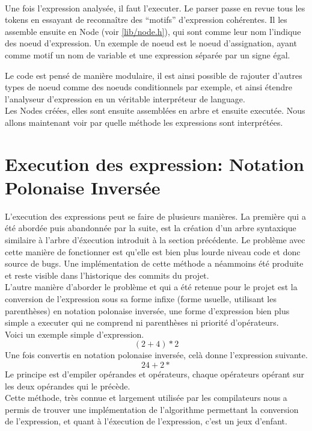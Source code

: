         \newpage

        \paragraph{}
            Une fois l'expression analysée, il faut l'executer. Le parser passe en revue tous les tokens en essayant de reconnaître des ``motifs'' d'expression cohérentes. Il les assemble ensuite en Node (voir \ref{lib/node.h}), qui sont comme leur nom l'indique des noeud d'expression. Un exemple de noeud est le noeud d'assignation, ayant comme motif un nom de variable et une expression séparée par un signe égal.


            Le code est pensé de manière modulaire, il est ainsi possible de rajouter d'autres types de noeud comme des noeuds conditionnels par exemple, et ainsi étendre l'analyseur d'expression en un véritable interpréteur de language.
            \\ Les Nodes créées, elles sont ensuite assemblées en arbre et ensuite executée. Nous allons maintenant voir par quelle méthode les  expressions sont interprétées.

    \section{Execution des expression: Notation Polonaise Inversée}
        L'execution des expressions peut se faire de plusieurs manières. La première qui a été abordée puis abandonnée par la suite, est la création d'un arbre syntaxique similaire à l'arbre d'éxecution introduit à la section précédente. Le problème avec cette manière de fonctionner est qu'elle est bien plus lourde niveau code et donc source de bugs. Une implémentation de cette méthode a néammoins été produite et reste visible dans l'historique des commits du projet.
        \\ L'autre manière d'aborder le problème et qui a été retenue pour le projet est la conversion de l'expression sous sa forme infixe (forme usuelle, utilisant les parenthèses) en notation polonaise inversée, une forme d'expression bien plus simple a executer qui ne comprend ni parenthèses ni priorité d'opérateurs.
        \\ Voici un exemple simple d'expression.
        \begin{equation}
            (2 + 4) * 2
        \end{equation}
        Une fois convertis en notation polonaise inversée, celà donne l'expression suivante.
        \begin{equation}
            2 4 + 2 *
        \end{equation}
        Le principe est d'empiler opérandes et opérateurs, chaque opérateurs opérant sur les deux opérandes qui le précède.
        \\ Cette méthode, très connue et largement utilisée par les compilateurs nous a permis de trouver une implémentation de l'algorithme permettant la conversion de l'expression, et quant à l'éxecution de l'expression, c'est un jeux d'enfant.